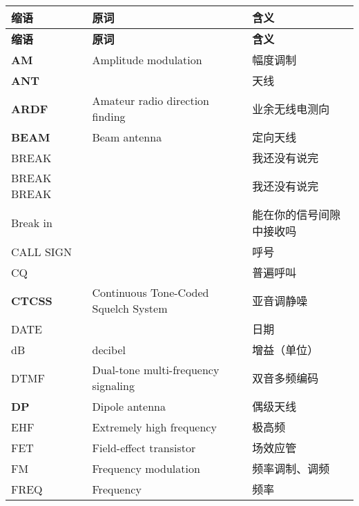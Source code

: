 \begin{longtable}[l]{lll}
  \textbf{缩语}    & \textbf{原词}                          & \textbf{含义}         \\
  \endfirsthead
  \textbf{缩语}    & \textbf{原词}                          & \textbf{含义}         \\
  \endhead
  \textbf{AM}    & Amplitude modulation                 & 幅度调制                \\
  \textbf{ANT}   &                                      & 天线                  \\
  \textbf{ARDF}  & Amateur radio direction finding      & 业余无线电测向             \\
  \textbf{BEAM}  & Beam antenna                         & 定向天线                \\
  BREAK          &                                      & 我还没有说完              \\
  BREAK BREAK    &                                      & 我还没有说完              \\
  Break in       &                                      & 能在你的信号间隙中接收吗        \\
  CALL SIGN      &                                      & 呼号                  \\
  CQ             &                                      & 普遍呼叫                \\
  \textbf{CTCSS} & Continuous Tone-Coded Squelch System & 亚音调静噪               \\
  DATE           &                                      & 日期                  \\
  dB             & decibel                              & 增益（单位）              \\
  DTMF           & Dual-tone multi-frequency signaling  & 双音多频编码              \\
  \textbf{DP}    & Dipole antenna                       & 偶级天线                \\
  EHF            & Extremely high frequency             & 极高频                 \\
  FET            & Field-effect transistor              & 场效应管                \\
  FM             & Frequency modulation                 & 频率调制、调频             \\
  FREQ           & Frequency                            & 频率                  \\

\end{longtable}
